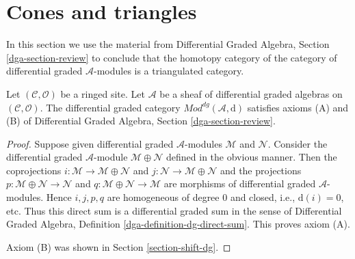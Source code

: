 \section{Cones and triangles}
\label{section-conclude-triangulated}

\noindent
In this section we use the material from
Differential Graded Algebra, Section \ref{dga-section-review}
to conclude that the homotopy category of the
category of differential graded $\mathcal{A}$-modules
is a triangulated category.

\begin{lemma}
\label{lemma-axioms-AB}
Let $(\mathcal{C}, \mathcal{O})$ be a ringed site.
Let $\mathcal{A}$ be a sheaf of differential graded algebras
on $(\mathcal{C}, \mathcal{O})$.
The differential graded category
$\textit{Mod}^{dg}(\mathcal{A}, \text{d})$
satisfies axioms (A) and (B) of
Differential Graded Algebra, Section \ref{dga-section-review}.
\end{lemma}

\begin{proof}
Suppose given differential graded $\mathcal{A}$-modules
$\mathcal{M}$ and $\mathcal{N}$. Consider the
differential graded $\mathcal{A}$-module $\mathcal{M} \oplus \mathcal{N}$
defined in the obvious manner. Then the coprojections
$i : \mathcal{M} \to \mathcal{M} \oplus \mathcal{N}$ and
$j : \mathcal{N} \to \mathcal{M} \oplus \mathcal{N}$ and the
projections
$p : \mathcal{M} \oplus \mathcal{N} \to \mathcal{N}$ and
$q : \mathcal{M} \oplus \mathcal{N} \to \mathcal{M}$
are morphisms of differential graded $\mathcal{A}$-modules.
Hence $i, j, p, q$ are homogeneous
of degree $0$ and closed, i.e., $\text{d}(i) = 0$, etc.
Thus this direct sum is a differential graded sum in the sense of
Differential Graded Algebra, Definition \ref{dga-definition-dg-direct-sum}.
This proves axiom (A).

\medskip\noindent
Axiom (B) was shown in Section \ref{section-shift-dg}.
\end{proof}

